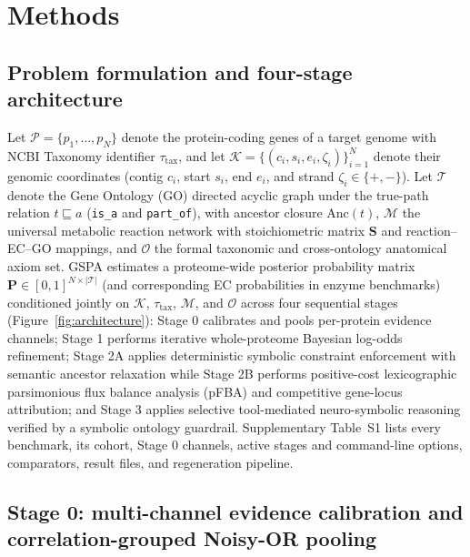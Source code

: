 \documentclass[10pt,twocolumn]{article}
\begin{document}
\section{Methods}

\subsection{Problem formulation and four-stage architecture}

Let $\mathcal{P} = \{p_1, \dots, p_N\}$ denote the protein-coding genes of a target genome with NCBI Taxonomy identifier $\tau_{\text{tax}}$, and let $\mathcal{K} = \{(c_i, s_i, e_i, \zeta_i)\}_{i=1}^N$ denote their genomic coordinates (contig $c_i$, start $s_i$, end $e_i$, and strand $\zeta_i \in \{+, -\}$). Let $\mathcal{T}$ denote the Gene Ontology (GO) directed acyclic graph under the true-path relation $t \sqsubseteq a$ (\texttt{is\_a} and \texttt{part\_of}), with ancestor closure $\text{Anc}(t)$, $\mathcal{M}$ the universal metabolic reaction network with stoichiometric matrix $\mathbf{S}$ and reaction--EC--GO mappings, and $\mathcal{O}$ the formal taxonomic and cross-ontology anatomical axiom set. GSPA estimates a proteome-wide posterior probability matrix $\mathbf{P} \in [0, 1]^{N \times |\mathcal{T}|}$ (and corresponding EC probabilities in enzyme benchmarks) conditioned jointly on $\mathcal{K}$, $\tau_{\text{tax}}$, $\mathcal{M}$, and $\mathcal{O}$ across four sequential stages (Figure~\ref{fig:architecture}): Stage 0 calibrates and pools per-protein evidence channels; Stage 1 performs iterative whole-proteome Bayesian log-odds refinement; Stage 2A applies deterministic symbolic constraint enforcement with semantic ancestor relaxation while Stage 2B performs positive-cost lexicographic parsimonious flux balance analysis (pFBA) and competitive gene-locus attribution; and Stage 3 applies selective tool-mediated neuro-symbolic reasoning verified by a symbolic ontology guardrail. Supplementary Table~S1 lists every benchmark, its cohort, Stage 0 channels, active stages and command-line options, comparators, result files, and regeneration pipeline.

\subsection{Stage 0: multi-channel evidence calibration and correlation-grouped Noisy-OR pooling}
\end{document}
